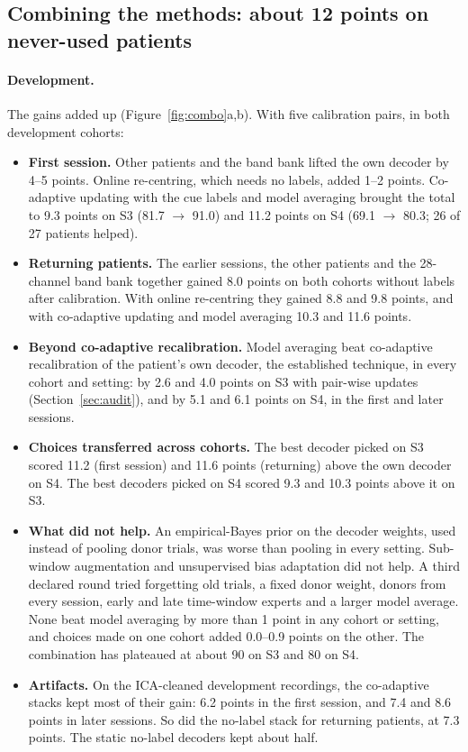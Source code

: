 \subsection{Combining the methods: about 12 points on never-used patients}
\label{sec:combo}

\paragraph{Development.} The gains added up (Figure~\ref{fig:combo}a,b). With five calibration pairs, in both development cohorts:
\begin{itemize}
  \item \textbf{First session.} Other patients and the band bank lifted the own decoder by 4--5 points. Online re-centring, which needs no labels, added 1--2 points. Co-adaptive updating with the cue labels and model averaging brought the total to 9.3 points on S3 (81.7\pct{} $\rightarrow$ 91.0\pct{}) and 11.2 points on S4 (69.1\pct{} $\rightarrow$ 80.3\pct{}; 26 of 27 patients helped).
  \item \textbf{Returning patients.} The earlier sessions, the other patients and the 28-channel band bank together gained 8.0 points on both cohorts without labels after calibration. With online re-centring they gained 8.8 and 9.8 points, and with co-adaptive updating and model averaging 10.3 and 11.6 points.
  \item \textbf{Beyond co-adaptive recalibration.} Model averaging beat co-adaptive recalibration of the patient's own decoder, the established technique, in every cohort and setting: by 2.6 and 4.0 points on S3 with pair-wise updates (Section~\ref{sec:audit}), and by 5.1 and 6.1 points on S4, in the first and later sessions.
  \item \textbf{Choices transferred across cohorts.} The best decoder picked on S3 scored 11.2 (first session) and 11.6 points (returning) above the own decoder on S4. The best decoders picked on S4 scored 9.3 and 10.3 points above it on S3.
  \item \textbf{What did not help.} An empirical-Bayes prior on the decoder weights, used instead of pooling donor trials, was worse than pooling in every setting. Sub-window augmentation and unsupervised bias adaptation did not help. A third declared round tried forgetting old trials, a fixed donor weight, donors from every session, early and late time-window experts and a larger model average. None beat model averaging by more than 1 point in any cohort or setting, and choices made on one cohort added 0.0--0.9 points on the other. The combination has plateaued at about 90\pct{} on S3 and 80\pct{} on S4.
  \item \textbf{Artifacts.} On the ICA-cleaned development recordings, the co-adaptive stacks kept most of their gain: 6.2 points in the first session, and 7.4 and 8.6 points in later sessions. So did the no-label stack for returning patients, at 7.3 points. The static no-label decoders kept about half.
\end{itemize}

